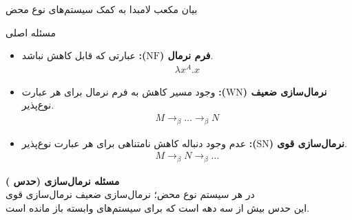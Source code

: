 \documentclass[12pt, aspectratio=169]{beamer}
\begin{document}
\begin{frame}{بیان مکعب لامبدا به کمک سیستم‌های نوع محض}
 
\begin{table}[h!]
\centering
{}
\end{table}
 
\end{frame}


\begin{frame}{مسئله اصلی}

{\small
  \begin{itemize}
      \item \textbf{فرم نرمال ($\mathrm{NF}$):} عبارتی که قابل کاهش نباشد.
      \begin{align*}
        \lambda x^A.x
      \end{align*}
      \item \textbf{نرمال‌سازی ضعیف ($\mathrm{WN}$):} وجود مسیر کاهش به فرم نرمال برای هر عبارت نوع‌پذیر.
      \begin{align*}
        M \rightarrow_{\beta} \dots \rightarrow_{\beta} N
      \end{align*}
      \item \textbf{نرمال‌سازی قوی ($\mathrm{SN}$):} عدم وجود دنباله کاهش نامتناهی برای هر عبارت نوع‌پذیر.
      \begin{align*}
        M \rightarrow_{\beta} N \rightarrow_{\beta} \dots
      \end{align*}
  \end{itemize}
}

\textbf{مسئله نرمال‌سازی (حدس )}\\
در هر سیستم نوع محض؛
نرمال‌سازی ضعیف
نرمال‌سازی قوی
\hfil\\

{\scriptsize این حدس بیش از سه دهه است که برای سیستم‌های وابسته باز مانده است.}

\end{frame}
\end{document}
